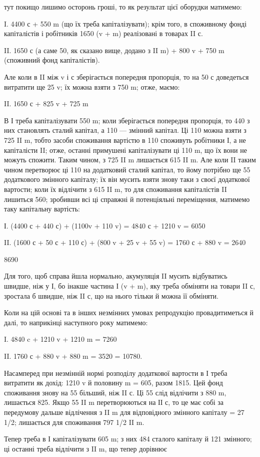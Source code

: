 \parcont{}  %
тут покищо лишимо осторонь гроші, то як результат цієї оборудки
матимемо:

I.    4400 с + 550 m (що їх треба капіталізувати); крім того, в споживному
фонді капіталістів і робітників 1650 (v + m) реалізовані в
товарах II с.

II.    1650 с (а саме 50, як сказано вище, додано з II m) + 800 v +
750 m (споживний фонд капіталістів).

Але коли в II між v і с зберігається попередня пропорція, то на 50 с
доведеться витратити ще 25 v; їх можна взяти з 750 m; отже, маємо:

II. 1650 с + 825 v + 725 m

В І треба капіталізувати 550 m; коли зберігається попередня пропорція,
то 440 з них становлять сталий капітал, а 110 — змінний капітал.
Ці 110 можна взяти з 725 II m, тобто засоби споживання вартістю в
110 споживуть робітники І, а не капіталісти II; отже, останні примушені
капіталізувати ці 110 m, що їх вони не можуть спожити. Таким чином,
з 725 II m лишається 615 II m. Але коли II таким чином перетворює
ці 110 на додатковий сталий капітал, то йому потрібно ще 55 додаткового
змінного капіталу; їх він мусить взяти знову таки з своєї додаткової
вартости; коли їх відлічити з 615 II m, то для споживання капіталістів II
лишиться 560; зробивши всі ці справжні й потенціяльні переміщення,
матимемо таку капітальну вартість:

І. (4400 с + 440 с) + (1100v + 110 v) = 4840 с + 1210 v = 6050

II. (1600 с + 50 с + 110 с) + (800 v + 25 v + 55 v) = 1760 с + 880 v = 2640

8690

Для того, щоб справа йшла нормально, акумуляція II мусить відбуватись
швидше, ніж у І, бо інакше частина І (v + m), яку треба обміняти
на товари II с, зростала б швидше, ніж II с, що на нього тільки й можна
її обміняти.

Коли на цій основі та в інших незмінних умовах репродукцію провадитиметься
й далі, то наприкінці наступного року матимемо:

I.    4840 c + 1210 v + 1210 m = 7260

II.    1760 с + 880 v + 880 m = 3520
= 10780.

Насамперед при незмінній нормі розподілу додаткової вартости в І
треба витратити як дохід: 1210 v й половину m = 605, разом 1815.
Цей фонд споживання знову на 55 більший, ніж II с. Ці 55 слід відлічити
з 880 m, лишається 825. Якщо 55 II m перетворюються на ІІ с, то це
має собі за передумову дальше відлічення з II m для відповідного змінного
капіталу = 27 1/2; лишається для споживання 797 1/2 II m.

Тепер треба в І капіталізувати 605 m; з них 484 сталого капіталу й
121 змінного; ці останні треба відлічити з II m, що тепер дорівнює
\parbreak{}  %
